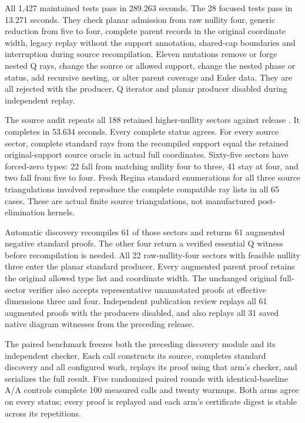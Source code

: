 All 1,427 maintained tests pass in 289.263 seconds. The 28 focused tests
pass in 13.271 seconds. They check planar admission from raw nullity four,
generic reduction from five to four, complete parent records in the
original coordinate width, legacy replay without the support annotation,
shared-cap boundaries and interruption during source recompilation.
Eleven mutations remove or forge nested Q rays, change the source or allowed
support, change the nested phase or status, add recursive nesting, or alter
parent coverage and Euler data. They are all rejected with the producer,
Q iterator and planar producer disabled during independent replay.

The source audit repeats all 188 retained higher-nullity sectors against
release . It completes in 53.634 seconds. Every complete
status agrees. For every source sector, complete standard rays from the
recompiled support equal the retained original-support source oracle in
actual full coordinates. Sixty-five sectors have forced-zero types: 22
fall from matching nullity four to three, 41 stay at four, and two fall from
five to four. Fresh Regina standard enumerations for all three source
triangulations involved reproduce the complete compatible ray lists in all
65 cases. These are actual finite source triangulations, not manufactured
post-elimination kernels.

Automatic discovery recompiles 61 of those sectors and returns 61 augmented
negative standard proofs. The other four return a verified essential Q
witness before recompilation is needed. All 22 raw-nullity-four sectors with
feasible nullity three enter the planar standard producer. Every augmented
parent proof retains the original allowed type list and coordinate width.
The unchanged original full-sector verifier also accepts representative
unannotated proofs at effective dimensions three and four. Independent
publication review replays all 61 augmented proofs with the producers
disabled, and also replays all 31 saved native diagram witnesses from the
preceding release.

The paired benchmark freezes both the preceding discovery module and its
independent checker. Each call constructs its source, completes standard
discovery and all configured work, replays its proof using that arm's
checker, and serializes the full result. Five randomized paired rounds
with identical-baseline A/A controls complete 100 measured calls and twenty
warmups. Both arms agree on every status; every proof is replayed and each
arm's certificate digest is stable across its repetitions.

